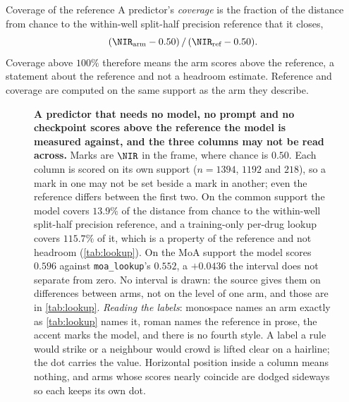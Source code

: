 \begin{defn}{Coverage of the reference}
A predictor's \emph{coverage} is the fraction of the distance from chance to the
within-well split-half precision reference that it closes,
\[
  (\NIR_{\text{arm}} - 0.50)\,/\,(\NIR_{\text{ref}} - 0.50).
\]
Coverage above $100\%$ therefore means the arm scores above the reference, a
statement about the reference and not a headroom estimate. Reference and coverage
are computed on the same support as the arm they describe.
\end{defn}

\begin{figure}[htbp]
\centering

\caption[The baseline ladder]{\textbf{A predictor that needs no model, no prompt
and no checkpoint scores above the reference the model is measured against, and
the three columns may not be read across.} Marks are $\NIR$ in the \Rframe{}
frame, where chance is $0.50$. Each column is scored on its own support
($n = \num{1394}$, $\num{1192}$ and $\num{218}$), so a mark in one may not be set
beside a mark in another; even the reference differs between the first two. On
the common support the model covers $13.9\%$ of the distance from chance to the
within-well split-half precision reference, and a training-only per-drug lookup
covers $115.7\%$ of it, which is a property of the reference and not headroom
(\cref{tab:lookup}). On the MoA support the model scores $0.596$ against
\texttt{moa\_lookup}'s $0.552$, a $+0.0436$ the interval does not separate from
zero. No interval is drawn: the source gives them on differences between arms,
not on the level of one arm, and those are in \cref{tab:lookup}. \emph{Reading
the labels}: monospace names an arm exactly as \cref{tab:lookup} names it, roman
names the reference in prose, the accent marks the model, and there is no fourth
style. A label a rule would strike or a neighbour would crowd is lifted clear on
a hairline; the dot carries the value. Horizontal position inside a column means
nothing, and arms whose scores nearly coincide are dodged sideways so each keeps
its own dot.}
\label{fig:ladder}
\end{figure}

